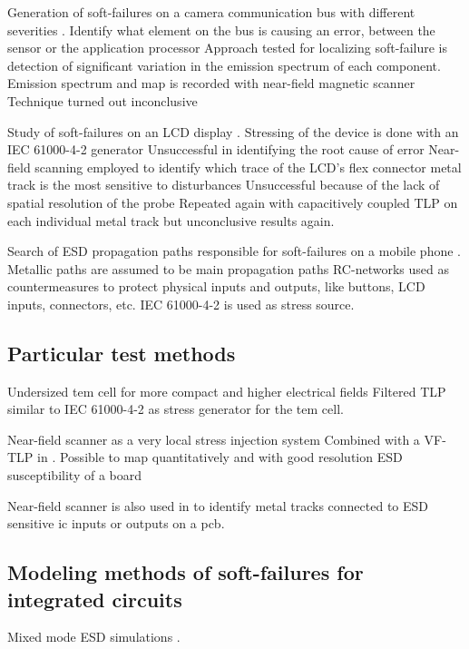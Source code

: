 Generation of soft-failures on a camera communication bus with different severities \cite{softFailSubsystem}.
Identify what element on the bus is causing an error, between the sensor or the application processor
Approach tested for localizing soft-failure is detection of significant variation in the emission spectrum of each component.
Emission spectrum and map is recorded with near-field magnetic scanner
Technique turned out inconclusive

Study of soft-failures on an LCD display \cite{softFailLCD}.
Stressing of the device is done with an IEC 61000-4-2 generator
Unsuccessful in identifying the root cause of error
Near-field scanning employed to identify which trace of the LCD's flex connector metal track is the most sensitive to disturbances
Unsuccessful because of the lack of spatial resolution of the probe
Repeated again with capacitively coupled TLP on each individual metal track but unconclusive results again.

Search of ESD propagation paths responsible for soft-failures on a mobile phone \cite{softFailMobile}.
Metallic paths are assumed to be main propagation paths
RC-networks used as countermeasures to protect physical inputs and outputs, like buttons, LCD inputs, connectors, etc.
IEC 61000-4-2 is used as stress source.

\subsection{Particular test methods}

%
Undersized \gls{tem} cell for more compact and higher electrical fields \cite{SDRAMCase}
Filtered TLP similar to IEC 61000-4-2 \cite{iec61000-4-2} as stress generator for the \gls{tem} cell.

%
Near-field scanner as a very local stress injection system
Combined with a VF-TLP in \cite{NearFieldInjectionFabrice}.
Possible to map quantitatively and with good resolution ESD susceptibility of a board

%
Near-field scanner is also used in \cite{NearFieldInjectionBis} to identify metal tracks connected to ESD sensitive \gls{ic} inputs or outputs on a \gls{pcb}.


\subsection{Modeling methods of soft-failures for integrated circuits}

%
Mixed mode ESD simulations \cite{mixedModeESDSims}.

